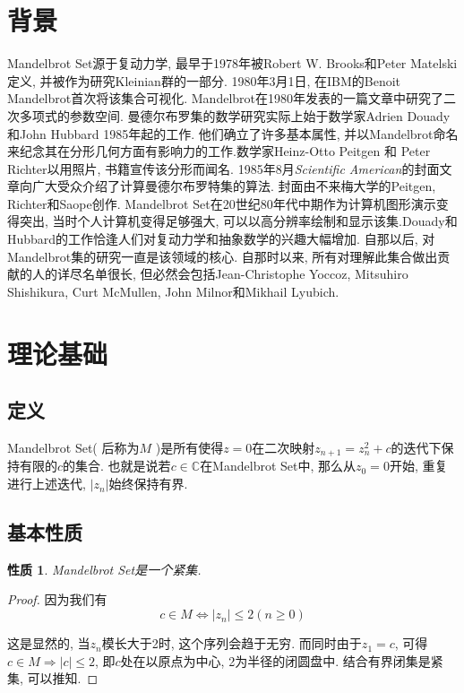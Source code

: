 \documentclass{ctexart}
\newtheorem{property}{性质}
\begin{document}
\section{背景}
Mandelbrot Set源于复动力学, 最早于1978年被Robert W. Brooks和Peter Matelski定义, 并被作为研究Kleinian群的一部分. 1980年3月1日, 在IBM的Benoit Mandelbrot首次将该集合可视化.
Mandelbrot在1980年发表的一篇文章中研究了二次多项式的参数空间. 曼德尔布罗集的数学研究实际上始于数学家Adrien Douady和John Hubbard 1985年起的工作. 他们确立了许多基本属性,
并以Mandelbrot命名来纪念其在分形几何方面有影响力的工作.数学家Heinz-Otto Peitgen 和 Peter Richter以用照片, 书籍宣传该分形而闻名.
1985年8月\textit{Scientific American}的封面文章向广大受众介绍了计算曼德尔布罗特集的算法. 封面由不来梅大学的Peitgen, Richter和Saope创作. 
Mandelbrot Set在20世纪80年代中期作为计算机图形演示变得突出, 当时个人计算机变得足够强大, 可以以高分辨率绘制和显示该集.Douady和Hubbard的工作恰逢人们对复动力学和抽象数学的兴趣大幅增加. 自那以后, 
对Mandelbrot集的研究一直是该领域的核心. 自那时以来, 所有对理解此集合做出贡献的人的详尽名单很长, 但必然会包括Jean-Christophe Yoccoz, Mitsuhiro Shishikura, Curt McMullen, John Milnor和Mikhail Lyubich.

\section{理论基础}

\subsection{定义}
Mandelbrot Set( 后称为$M$ )是所有使得$z=0$在二次映射$z_{n+1}=z_n^2+c$的迭代下保持有限的$c$的集合. 也就是说若$c \in \mathbb{C}$在Mandelbrot Set中, 那么从$z_0=0$开始, 重复进行上述迭代, $|z_n|$始终保持有界.

\subsection{基本性质}

\begin{property}
Mandelbrot Set是一个紧集. 
\label{prop:compact}
\end{property}

\begin{proof}
因为我们有$$c \in M \iff |z_n| \le 2 (n \ge 0)$$
\par 这是显然的, 当$z_n$模长大于2时, 这个序列会趋于无穷. 而同时由于$z_1=c$, 可得$c \in M \Rightarrow |c| \le 2$, 即$c$处在以原点为中心, 2为半径的闭圆盘中. 结合有界闭集是紧集, 可以推知.
\end{proof}
\end{document}
